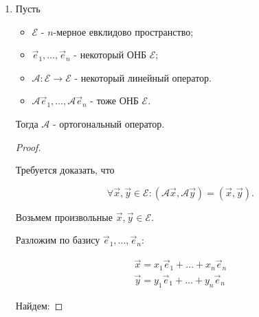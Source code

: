 \begin{enumerate}[label={\arabic*°.}]
    \item Пусть 
    
    \begin{itemize}
        \item $\mathcal{E}$ - $n$-мерное евклидово пространство;
        \item $\vec{e}_1, \ldots, \vec{e}_n$ - некоторый ОНБ $\mathcal{E}$;
        \item $\mathscr{A} \colon \mathcal{E} \to \mathcal{E}$ - некоторый линейный оператор.
        \item $\mathscr{A}\vec{e}_1, \ldots, \mathscr{A}\vec{e}_n$ - тоже ОНБ $\mathcal{E}$.
    \end{itemize}

    Тогда $\mathscr{A}$ - ортогональный оператор.

    \begin{proof}~
    
        Требуется доказать, что

        $$\forall \vec{x}, \vec{y} \in \mathcal{E} \colon (\mathscr{A}\vec{x}, \mathscr{A}\vec{y}) = (\vec{x}, \vec{y}).$$

        Возьмем произвольные $\vec{x}, \vec{y} \in \mathcal{E}$.

        Разложим по базису $\vec{e}_1, \ldots, \vec{e}_n$:

        \begin{gather*}
            \vec{x} = x_1\vec{e}_1 + \ldots + x_n\vec{e}_n \\
            \vec{y} = y_1\vec{e}_1 + \ldots + y_n\vec{e}_n
        \end{gather*}

        Найдем:


\end{proof}
\end{enumerate}
